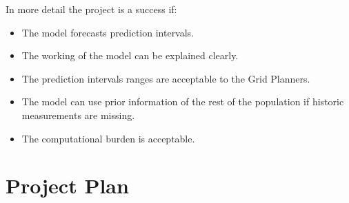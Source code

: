 \documentclass[letterpaper,10pt,english]{sphinxmanual}
\begin{document}
In more detail the project is a success if:
\begin{itemize}
\item {} 
The model forecasts prediction intervals.

\item {} 
The working of the model can be explained clearly.

\item {} 
The prediction intervals ranges are acceptable to the Grid Planners.

\item {} 
The model can use prior information of the rest of the population if historic measurements are missing.

\item {} 
The computational burden is acceptable.

\end{itemize}


\section{Project Plan}
\label{\detokenize{business_understanding:project-plan}}
\end{document}
